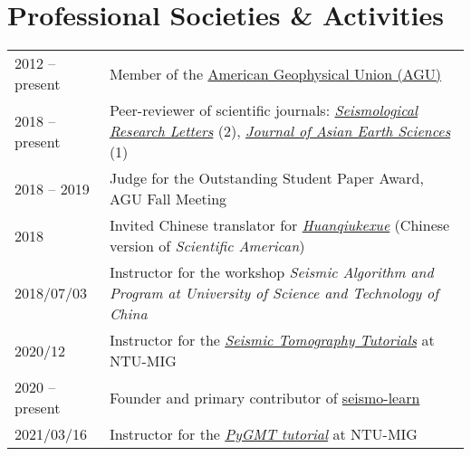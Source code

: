 \section*{Professional Societies \& Activities}

\newcommand{\tabitem}{~~\llap{\textbullet}~~}

\begin{tabular}{p{} p{}}
2012 -- present & Member of the \href{https://sites.agu.org/}{American Geophysical Union (AGU)} \\
2018 -- present & Peer-reviewer of scientific journals:
                  \textit{\href{https://pubs.geoscienceworld.org/srl/}{Seismological Research Letters}} (2),
                  \textit{\href{https://www.journals.elsevier.com/journal-of-asian-earth-sciences/}{Journal of Asian Earth Sciences}} (1) \\
2018 -- 2019 & Judge for the Outstanding Student Paper Award, AGU Fall Meeting \\
2018         & Invited Chinese translator for \href{https://huanqiukexue.com/}{\textit{Huanqiukexue}} (Chinese version of \textit{Scientific American}) \\
2018/07/03   & Instructor for the workshop \textit{Seismic Algorithm and Program at University of Science and Technology of China} \\
2020/12 & Instructor for the \href{https://migg-ntu.github.io/SeisTomo_Tutorials/}{\textit{Seismic Tomography Tutorials}} at NTU-MIG \\
2020 -- present & Founder and primary contributor of \href{https://seismo-learn.org/}{seismo-learn} \\
2021/03/16 & Instructor for the \href{https://github.com/MIGG-NTU/PyGMT2021}{\textit{PyGMT tutorial}} at NTU-MIG \\
\end{tabular}
